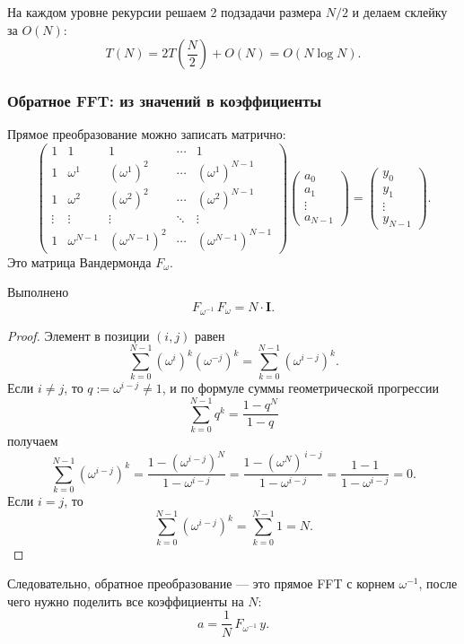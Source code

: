 На каждом уровне рекурсии решаем 2 подзадачи размера $N/2$
и делаем склейку за $O(N)$:
\[
T(N)=2T\!\left(\frac{N}{2}\right)+O(N)=O(N\log N).
\]

\subsubsection*{Обратное FFT: из значений в коэффициенты}

Прямое преобразование можно записать матрично:
\[
\begin{pmatrix}
	1 & 1 & 1 & \cdots & 1 \\
	1 & \omega^1 & (\omega^1)^2 & \cdots & (\omega^1)^{N-1} \\
	1 & \omega^2 & (\omega^2)^2 & \cdots & (\omega^2)^{N-1} \\
	\vdots & \vdots & \vdots & \ddots & \vdots \\
	1 & \omega^{N-1} & (\omega^{N-1})^2 & \cdots & (\omega^{N-1})^{N-1}
\end{pmatrix}
\begin{pmatrix}
	a_0\\ a_1\\ \vdots\\ a_{N-1}
\end{pmatrix}
=
\begin{pmatrix}
	y_0\\ y_1\\ \vdots\\ y_{N-1}
\end{pmatrix}.
\]
Это матрица Вандермонда $F_\omega$.

\begin{Statement}{}{}
	Выполнено
	\[
	F_{\omega^{-1}}\,F_\omega = N\cdot \mathbf{I}.
	\]
\end{Statement}

\begin{proof}
	Элемент в позиции $(i,j)$ равен
	\[
	\sum_{k=0}^{N-1}(\omega^i)^k(\omega^{-j})^k
	=\sum_{k=0}^{N-1}(\omega^{i-j})^k.
	\]
	Если $i\neq j$, то $q:=\omega^{i-j}\neq 1$, и по формуле суммы геометрической прогрессии
	\[
	\sum_{k=0}^{N-1} q^k=\frac{1-q^N}{1-q}
	\]
	получаем
	\[
	\sum_{k=0}^{N-1}(\omega^{i-j})^k
	=\frac{1-(\omega^{i-j})^N}{1-\omega^{i-j}}
	=\frac{1-(\omega^N)^{\,i-j}}{1-\omega^{i-j}}
	=\frac{1-1}{1-\omega^{i-j}}=0.
	\]
	Если $i=j$, то
	\[
	\sum_{k=0}^{N-1}(\omega^{i-j})^k=\sum_{k=0}^{N-1}1=N.
	\]
\end{proof}

Следовательно, обратное преобразование — это прямое FFT с корнем $\omega^{-1}$,
после чего нужно поделить все коэффициенты на $N$:
\[
a = \frac{1}{N}\,F_{\omega^{-1}}\,y.
\]

